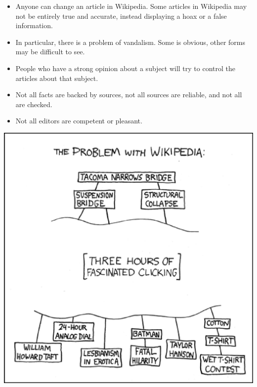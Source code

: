\documentclass[a4paper,landscape,headrule,footrule,xetex]{foils}
\begin{document}
\begin{itemize}
\item Anyone can change an article in Wikipedia. Some articles in
  Wikipedia may not be entirely true and accurate, instead displaying
  a hoax or a false information.
\item In particular, there is a problem of vandalism. Some  is obvious,
  other forms  may be difficult to see.
\item People who have a strong opinion about a subject will try to
  control the articles about that subject.
\item Not all facts are backed by sources, not all sources are
  reliable, and not all are checked.
\item Not all editors are competent or pleasant. 
\end{itemize}

\begin{center}
  \includegraphics[height=\textheight]{../pics/xkcd-problem_wiki}
\end{center}

\end{document}
